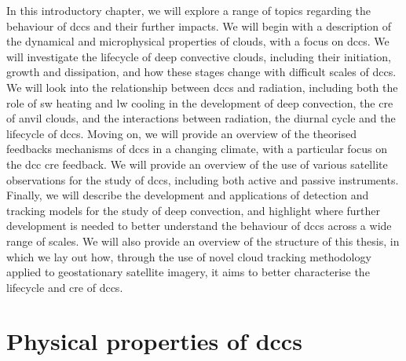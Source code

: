 In this introductory chapter, we will explore a range of topics regarding the behaviour of \acrshort{dcc}s and their further impacts.
We will begin with a description of the dynamical and microphysical properties of clouds, with a focus on \acrshort{dcc}s.
We will investigate the lifecycle of deep convective clouds, including their initiation, growth and dissipation, and how these stages change with difficult scales of \acrshort{dcc}s.
We will look into the relationship between \acrshort{dcc}s and radiation, including both the role of \acrfull{sw} heating and \acrfull{lw} cooling in the development of deep convection, the \acrfull{cre} of anvil clouds, and the interactions between radiation, the diurnal cycle and the lifecycle of \acrshort{dcc}s.
Moving on, we will provide an overview of the theorised feedbacks mechanisms of \acrshort{dcc}s in a changing climate, with a particular focus on the \acrshort{dcc} \acrshort{cre} feedback.
We will provide an overview of the use of various satellite observations for the study of \acrshort{dcc}s, including both active and passive instruments.
Finally, we will describe the development and applications of detection and tracking models for the study of deep convection, and highlight where further development is needed to better understand the behaviour of \acrshort{dcc}s across a wide range of scales.
We will also provide an overview of the structure of this thesis, in which we lay out how, through the use of novel cloud tracking methodology applied to geostationary satellite imagery, it aims to better characterise the lifecycle and \acrshort{cre} of \acrshort{dcc}s.


\section{Physical properties of \acrshort{dcc}s}

